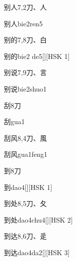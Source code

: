 \begin{entry}{别人}{7,2}{⼑、⼈}
  \begin{phonetics}{别人}{bie2ren5}
  \end{phonetics}
\end{entry}

\begin{entry}{别的}{7,8}{⼑、⽩}
  \begin{phonetics}{别的}{bie2 de5}[][HSK 1]
  \end{phonetics}
\end{entry}

\begin{entry}{别说}{7,9}{⼑、⾔}
  \begin{phonetics}{别说}{bie2shuo1}
  \end{phonetics}
\end{entry}

\begin{entry}{刮}{8}{⼑}
  \begin{phonetics}{刮}{gua1}
  \end{phonetics}
\end{entry}

\begin{entry}{刮风}{8,4}{⼑、⾵}
  \begin{phonetics}{刮风}{gua1feng1}
  \end{phonetics}
\end{entry}

\begin{entry}{到}{8}{⼑}
  \begin{phonetics}{到}{dao4}[][HSK 1]
  \end{phonetics}
\end{entry}

\begin{entry}{到处}{8,5}{⼑、⼡}
  \begin{phonetics}{到处}{dao4chu4}[][HSK 2]
  \end{phonetics}
\end{entry}

\begin{entry}{到达}{8,6}{⼑、⾡}
  \begin{phonetics}{到达}{dao4da2}[][HSK 3]
  \end{phonetics}
\end{entry}

